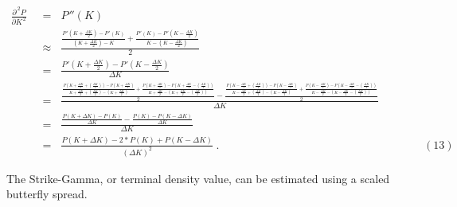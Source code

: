 \documentclass[12pt]{article}
\begin{document}
{\footnotesize
\begin{align*}
\frac{\partial^{\hspace{2pt} 2} P}{\partial K^{\hspace{1pt} 2}}   \hspace{4pt} &= \hspace{7pt}   P\hspace{1pt}''(K)
\\[20pt]
\hspace{4pt} &\approx \hspace{7pt}   \frac{\frac{P\hspace{1pt}'(K + \frac{\Delta K}{2}) - P\hspace{1pt}'(K)}{(K + \frac{\Delta K}{2}) - K} + \frac{P\hspace{1pt}'(K) - P\hspace{1pt}'(K - \frac{\Delta K}{2})}{K - (K - \frac{\Delta K}{2})}}{2}
\\[20pt]
\hspace{4pt} &= \hspace{7pt}   \frac{P\hspace{1pt}'(K + \frac{\Delta K}{2}) - P\hspace{1pt}'(K - \frac{\Delta K}{2})}{\Delta K}
\\[20pt]
\hspace{4pt} &= \hspace{7pt}   \frac{\frac{\frac{P(K+\frac{\Delta K}{2}+(\frac{\Delta K}{2}))-P(K+\frac{\Delta K}{2})}{K+\frac{\Delta K}{2}+(\frac{\Delta K}{2})-(K+\frac{\Delta K}{2})} + \frac{P(K+\frac{\Delta K}{2})-P(K+\frac{\Delta K}{2}-(\frac{\Delta K}{2}))}{K+\frac{\Delta K}{2}-(K+\frac{\Delta K}{2}-(\frac{\Delta K}{2}))}}{2} - \frac{\frac{P(K-\frac{\Delta K}{2}+(\frac{\Delta K}{2}))-P(K-\frac{\Delta K}{2})}{K-\frac{\Delta K}{2}+(\frac{\Delta K}{2})-(K-\frac{\Delta K}{2})} + \frac{P(K-\frac{\Delta K}{2})-P(K-\frac{\Delta K}{2}-(\frac{\Delta K}{2}))}{K-\frac{\Delta K}{2}-(K-\frac{\Delta K}{2}-(\frac{\Delta K}{2}))}}{2}}{\Delta K}
\\[20pt]
\hspace{4pt} &= \hspace{7pt}   \frac{\frac{P(K + \Delta K)-P(K)}{\Delta K} - \frac{P(K)-P(K - \Delta K)}{\Delta K}}{\Delta K}
\\[20pt]
\hspace{4pt} &= \hspace{7pt}   \frac{P(K + \Delta K) - 2*P(K) + P(K - \Delta K)}{(\Delta K)^{2}} \hspace{3pt}. \hspace{220pt} (13)
\end{align*}
}

\begin{paragraph}
\indent The Strike-Gamma, or terminal density value, can be estimated using a scaled butterfly spread.
\end{paragraph}
\end{document}
